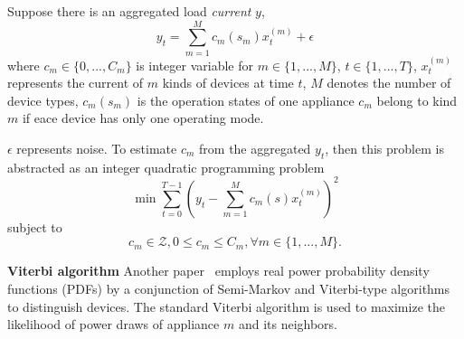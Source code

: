 Suppose there is an aggregated load \textit{current} $y$,
\begin{equation}
y_t= \sum_{m=1}^{M}c_m(s_m)x_{t}^{(m)}+\epsilon
\end{equation}
where $c_m \in \{0,...,C_m\}$ is integer variable for $m\in\{1,...,M\}$, 
$t \in \{1,..., T\}$, 
$x_{t}^{(m)}$ represents the current of  $m$ kinds of devices at time $t$, 
$M$ denotes the number of device types, 
$c_m(s_m)$ is the operation states of one appliance $c_m$ belong to kind $m$ if 
eace device has only one operating mode. 

$\epsilon$ represents noise. 
To estimate $c_m$ from the aggregated $y_t$,
then this problem is abstracted as an integer
quadratic programming problem
\begin{equation}
\min \sum_{t=0}^{T-1}(y_t- \sum_{m=1}^{M}c_m(s)x_{t}^{(m)})^2
\end{equation}
subject to
\begin{displaymath}
c_m \in \mathcal{Z}, 0 \leq c_m \leq C_m, \forall m \in \{1,...,M \}.
\end{displaymath}




\textbf{Viterbi algorithm}
Another paper~\cite{zeifman2012disaggregation} 
employs real power probability density functions (PDFs) by a conjunction of Semi-Markov and Viterbi-type algorithms to distinguish devices. %
The standard Viterbi algorithm is used to maximize the likelihood of power
draws of appliance $m$ and its neighbors. 

